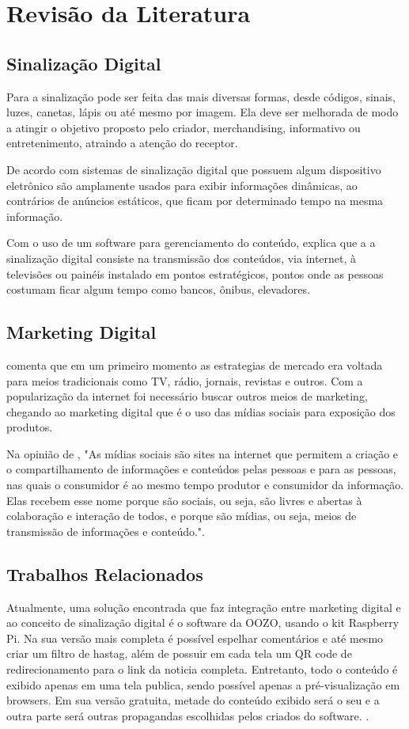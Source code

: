 \documentclass[
	12pt,				%
	openright,			%
	oneside,			%
	a4paper,			%
	english,			%
	french,				%
	spanish,			%
	brazil,				%
	]{abntex2}
\begin{document}
\section*{Revisão da Literatura}
	

	\subsection*{Sinalização Digital}
	Para \cite{munari2006} a sinalização pode ser feita das mais diversas formas, desde códigos, sinais, luzes, canetas, lápis ou até mesmo por imagem. Ela deve ser melhorada de modo a  atingir o objetivo proposto pelo criador, merchandising, informativo ou entretenimento, atraindo a atenção do receptor. 
	
	De acordo com \cite{mishima2016} sistemas de sinalização digital que possuem algum dispositivo eletrônico são amplamente usados para exibir informações dinâmicas, ao contrários de anúncios estáticos, que ficam por determinado tempo na mesma informação. 
	
	Com o uso de um software para gerenciamento do conteúdo, \cite{machado2010} explica que a a sinalização digital consiste na transmissão dos conteúdos, via internet, à televisões ou painéis instalado em pontos estratégicos, pontos onde as pessoas costumam ficar algum tempo como bancos, ônibus, elevadores.
	
	\subsection*{Marketing Digital}
	\cite{santos2014} comenta que em um primeiro momento as estrategias de mercado era voltada para meios tradicionais como TV, rádio, jornais, revistas e outros. Com a popularização da internet foi necessário buscar outros meios de marketing, chegando ao marketing digital que é o uso das mídias sociais para exposição dos produtos.
	
	Na opinião de \cite{torres2000}, "As mídias sociais são sites na internet que permitem a criação e o compartilhamento de informações e conteúdos pelas pessoas e para as pessoas, nas quais o consumidor é ao mesmo tempo produtor e consumidor da informação. Elas recebem esse nome porque são sociais, ou seja, são livres e abertas à colaboração e interação de todos, e porque são mídias, ou seja, meios de transmissão de informações e conteúdo.". 
	
	\subsection*{Trabalhos Relacionados}
	Atualmente, uma solução encontrada que faz integração entre marketing digital e ao conceito de sinalização digital é o software da OOZO, usando o kit Raspberry Pi. Na sua versão mais completa é possível espelhar comentários e até mesmo criar um filtro de hastag, além de possuir em cada tela um QR code de redirecionamento para o link da noticia completa. Entretanto, todo o conteúdo é exibido apenas em uma tela publica, sendo possível apenas a pré-visualização em browsers. Em sua versão gratuita, metade do conteúdo exibido será o seu e a outra parte será outras propagandas escolhidas pelos criados do software. \cite{oozo2017}.
	
\end{document}
